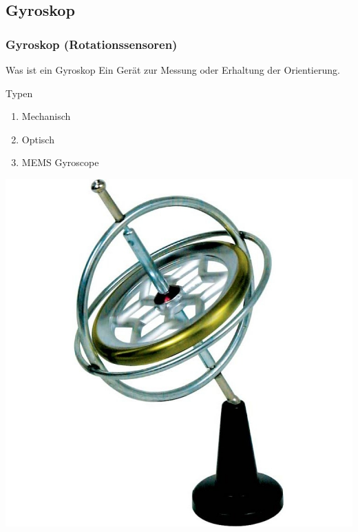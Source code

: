 \documentclass[10pt,a4paper,oneside]{beamer}
\begin{document}
\begin{frame}
  \section{Gyroskop}
  \frametitle{Gyroskop (Rotationssensoren)}
  
  \begin{block}{Was ist ein Gyroskop}
  	Ein Gerät zur Messung oder Erhaltung der Orientierung.
  \end{block}
  
  \bigskip
  
  Typen
  \begin{enumerate}
  	\item Mechanisch
  	\item Optisch
  	\item MEMS Gyroscope
  \end{enumerate}
  
	\begin{center}
  		\includegraphics[scale=0.09]{images/Original_gyroscope-1000x1000.jpg} 
	\end{center}
\end{frame}
\end{document}
